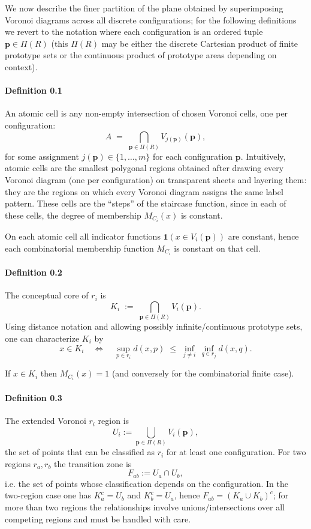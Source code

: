\documentclass[11pt]{article}
\begin{document}
We now describe the finer partition of the plane obtained by superimposing Voronoi diagrams across all discrete configurations; for the following definitions we revert to the notation where each configuration is an ordered tuple \(\mathbf p\in\Pi(R)\) (this \(\Pi(R)\) may be either the discrete Cartesian product of finite prototype sets or the continuous product of prototype areas depending on context).

\paragraph{Definition 0.1} An atomic cell is any non-empty intersection of chosen Voronoi cells, one per configuration:
\[
A \;=\; \bigcap_{\mathbf p\in\Pi(R)} V_{j(\mathbf p)}(\mathbf p),
\]
for some assignment \(j(\mathbf p)\in\{1,\dots,m\}\) for each configuration \(\mathbf p\). Intuitively, atomic cells are the smallest polygonal regions obtained after drawing every Voronoi diagram (one per configuration) on transparent sheets and layering them: they are the regions on which every Voronoi diagram assigns the same label pattern. These cells are the “steps” of the staircase function, since in each of these cells, the degree of membership $M_{C_i}(x)$ is constant. 

On each atomic cell all indicator functions \(\mathbf{1}(x\in V_i(\mathbf p))\) are constant, hence each combinatorial membership function \(M_{C_i}\) is constant on that cell.

\paragraph{Definition 0.2} The conceptual core of \(r_i\) is
\[
K_i \;:=\; \bigcap_{\mathbf p\in\Pi(R)} V_i(\mathbf p).
\]
Using distance notation and allowing possibly infinite/continuous prototype sets, one can characterize \(K_i\) by
\[
x\in K_i \quad\Longleftrightarrow\quad
\sup_{p\in r_i} d(x,p)\;\le\;\inf_{j\ne i}\,\inf_{q\in r_j} d(x,q).
\]

If \(x\in K_i\) then \(M_{C_i}(x)=1\) (and conversely for the combinatorial finite case).

\paragraph{Definition 0.3} The extended Voronoi \(r_i\) region is 
\[
U_i := \bigcup_{\mathbf p\in\Pi(R)} V_i(\mathbf p),
\]
the set of points that can be classified as \(r_i\) for at least one configuration. For two regions \(r_a,r_b\) the transition zone is
\[
F_{ab} := U_a\cap U_b,
\]
i.e. the set of points whose classification depends on the configuration. In the two-region case one has \(K_a^c = U_b\) and \(K_b^c = U_a\), hence \(F_{ab}=(K_a\cup K_b)^c\); for more than two regions the relationships involve unions/intersections over all competing regions and must be handled with care.
\end{document}

